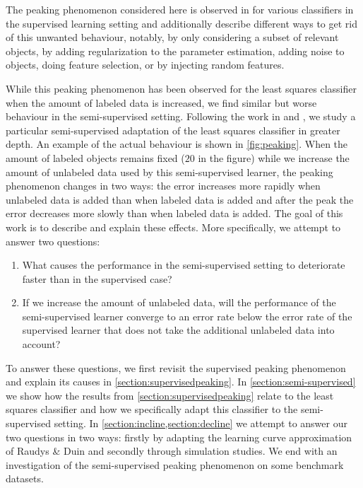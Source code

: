 \documentclass[runningheads,a4paper]{llncs}\usepackage[]{graphicx}\usepackage[]{color}
\begin{document}
The peaking phenomenon considered here is observed in \cite{Duin1995,Skurichina1996,Opper1995,Duin2000,Opper2001} for various classifiers in the supervised learning setting and \cite{Duin1995,Skurichina1999,Duin2000,Opper2001} additionally describe different ways to get rid of this unwanted behaviour, notably, by only considering a subset of relevant objects, by adding regularization to the parameter estimation, adding noise to objects, doing feature selection, or by injecting random features.

While this peaking phenomenon has been observed for the least squares classifier when the amount of labeled data is increased, we find similar but worse behaviour in the semi-supervised setting.  Following the work in \cite{Duin1995} and \cite{Fan2008}, we study a particular semi-supervised adaptation of the least squares classifier in greater depth. An example of the actual behaviour is shown in \cref{fig:peaking}. When the amount of labeled objects remains fixed ($20$ in the figure) while we increase the amount of unlabeled data used by this semi-supervised learner, the peaking phenomenon changes in two ways: the error increases more rapidly when unlabeled data is added than when labeled data is added and after the peak the error decreases more slowly than when labeled data is added. The goal of this work is to describe and explain these effects. More specifically, we attempt to answer two questions:
\begin{enumerate}
\item What causes the performance in the semi-supervised setting to deteriorate faster than in the supervised case?
\item If we increase the amount of unlabeled data, will the performance of the semi-supervised learner converge to an error rate below the error rate of the supervised learner that does not take the additional unlabeled data into account?
\end{enumerate}
To answer these questions, we first revisit the supervised peaking phenomenon and explain its causes in \cref{section:supervisedpeaking}. In \cref{section:semi-supervised} we show how the results from \cref{section:supervisedpeaking} relate to the least squares classifier and how we specifically adapt this classifier to the semi-supervised setting. In \cref{section:incline,section:decline} we attempt to answer our two questions in two ways: firstly by adapting the learning curve approximation of Raudys \& Duin \cite{Raudys1998} and secondly through simulation studies. We end with an investigation of the semi-supervised peaking phenomenon on some benchmark datasets.
\end{document}
